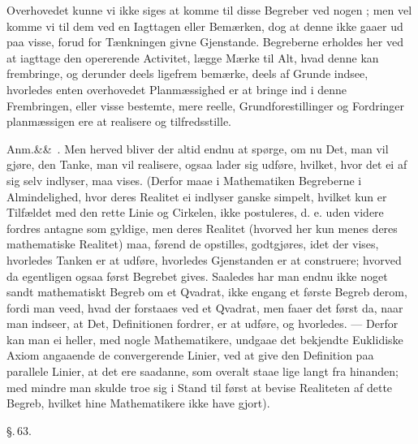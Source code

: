 \documentclass[12pt]{book}
\makeatletter
\def\sperr#1{#1}%
\def\textit#1{#1}%
\def\emph#1{#1}%
\newcommand{\sperr}[1]{\textls[180]{#1}}
\newcommand{\umph}[2][misc]{%
  \@ifundefined{umph@#1@on}{#2}{\emph{#2}}}
\newcommand{\parag}[1]{%
  \par\vspace{0.9\baselineskip}%
  {\centering\textit{\S.\,#1.}\par}%
  \vspace{0.35\baselineskip}%
  \noindent\hspace{\parindent}\ignorespaces
}
\newcommand{\anm}[1]{%
  \par\vspace{0.5\baselineskip}%
  \noindent\hspace{\parindent}\sperr{Anm.}\ifx&#1&\else~\textit{#1}.\fi
  \enspace\ignorespaces
}
\newcommand{\opage}[1]{\marginnote{\footnotesize\textit{[#1]}}}
\makeatother
\begin{document}
Overhovedet kunne vi ikke siges at komme til disse Begreber ved nogen
\umph[schwab]{Abstraheren}; men vel komme vi til dem ved en Iagttagen eller Bemærken,
dog at denne ikke gaaer ud paa visse, forud for Tænkningen givne Gjenstande.
Begreberne erholdes her ved at iagttage den opererende Activitet, lægge Mærke til Alt,
hvad denne kan frembringe, og derunder deels ligefrem bemærke, deels af Grunde indsee,
hvorledes enten overhovedet Planmæssighed er at bringe ind i denne Frembringen, eller
visse bestemte, mere reelle, Grundforestillinger og Fordringer planmæssigen ere at
realisere og tilfredsstille.

\anm{} Men herved bliver der altid endnu at spørge, om nu Det, man vil gjøre, den
Tanke, man vil realisere, ogsaa lader sig udføre, hvilket, hvor det ei af sig selv
indlyser, maa vises. (Derfor maae i Mathematiken Begreberne
\opage{163} i Almindelighed, hvor deres Realitet ei indlyser ganske simpelt, hvilket kun er
Tilfældet med den rette Linie og Cirkelen, ikke postuleres, d. e. uden videre fordres
antagne som gyldige, men deres Realitet (hvorved her kun menes deres mathematiske
Realitet) maa, førend de opstilles, godtgjøres, idet der vises, hvorledes Tanken er at
udføre, hvorledes Gjenstanden er at construere; hvorved da egentligen ogsaa først
Begrebet gives. Saaledes har man endnu ikke noget sandt mathematiskt Begreb om et
Qvadrat, ikke engang et første Begreb derom, fordi man veed, hvad der forstaaes ved et
Qvadrat, men faaer det først da, naar man indseer, at Det, Definitionen fordrer, er at
udføre, og hvorledes. --- Derfor kan man ei heller, med nogle Mathematikere, undgaae
det bekjendte Euklidiske Axiom angaaende de convergerende Linier, ved at give den
Definition paa parallele Linier, at det ere saadanne, som overalt staae lige langt fra
hinanden; med mindre man skulde troe sig i Stand til først at bevise Realiteten af
dette Begreb, hvilket hine Mathematikere ikke have gjort).

\parag{63}
\end{document}
